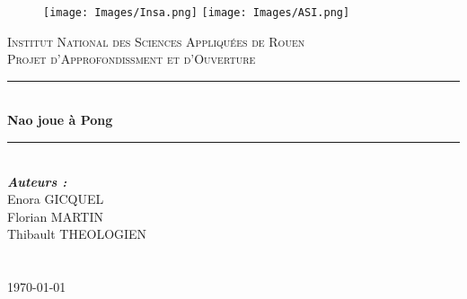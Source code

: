 \documentclass[a4paper,12pt]{article}
\begin{document}
\begin{titlepage}
\thispagestyle{empty}
\begin{figure}
	\texttt{[image: Images/Insa.png]}\hfill
	\texttt{[image: Images/ASI.png]}\
\end{figure}

\newcommand{\HRule}{\rule{\linewidth}{0.5mm}} 
\center 
{}\textsc{\huge Institut National des Sciences Appliqu\'{e}es de Rouen}\\[1.5cm] 
\textsc{\Large Projet d'Approfondissment et d'Ouverture}\\[2cm] 

\HRule \\[0.4cm]
{ \huge \bfseries Nao joue à Pong}\\[0.2cm] 
\HRule \\[2.5cm]
  


\large \emph{\textbf{Auteurs :}}\\
	Enora GICQUEL\\
	Florian MARTIN\\
	Thibault THEOLOGIEN \\

~\\ ~\\[1cm]

\vfill{\today}\\[3cm]

\end{titlepage}

	\pagebreak
	\tableofcontents
	\pagebreak

	
	
	
	
	
	
	
	
	
	
\end{document}
